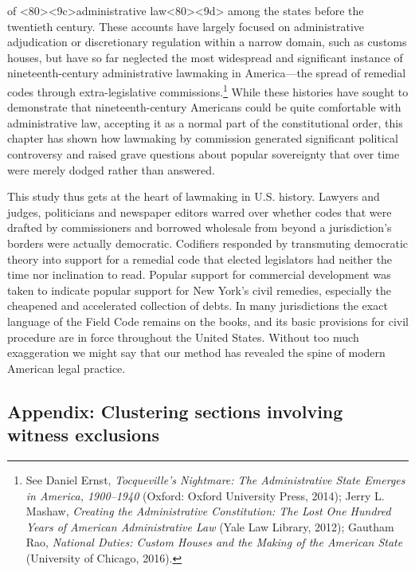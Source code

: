 \documentclass[12pt,]{article}
\let\rmarkdownfootnote\footnote%
\def\footnote{\protect\rmarkdownfootnote}
\begin{document}
of \textless80\textgreater\textless9c\textgreater administrative
law\textless80\textgreater\textless9d\textgreater{} among the states
before the twentieth century. These accounts have largely focused on
administrative adjudication or discretionary regulation within a narrow
domain, such as customs houses, but have so far neglected the most
widespread and significant instance of nineteenth-century administrative
lawmaking in America---the spread of remedial codes through
extra-legislative commissions.\footnote{See Daniel Ernst,
  \emph{Tocqueville's Nightmare: The Administrative State Emerges in
  America, 1900--1940} (Oxford: Oxford University Press, 2014); Jerry L.
  Mashaw, \emph{Creating the Administrative Constitution: The Lost One
  Hundred Years of American Administrative Law} (Yale Law Library,
  2012); Gautham Rao, \emph{National Duties: Custom Houses and the
  Making of the American State} (University of Chicago, 2016).} While
these histories have sought to demonstrate that nineteenth-century
Americans could be quite comfortable with administrative law, accepting
it as a normal part of the constitutional order, this chapter has shown
how lawmaking by commission generated significant political controversy
and raised grave questions about popular sovereignty that over time were
merely dodged rather than answered.

This study thus gets at the heart of lawmaking in U.S. history. Lawyers
and judges, politicians and newspaper editors warred over whether codes
that were drafted by commissioners and borrowed wholesale from beyond a
jurisdiction's borders were actually democratic. Codifiers responded by
transmuting democratic theory into support for a remedial code that
elected legislators had neither the time nor inclination to read.
Popular support for commercial development was taken to indicate popular
support for New York's civil remedies, especially the cheapened and
accelerated collection of debts. In many jurisdictions the exact
language of the Field Code remains on the books, and its basic
provisions for civil procedure are in force throughout the United
States. Without too much exaggeration we might say that our method has
revealed the spine of modern American legal practice.

\hypertarget{appendix-clustering-sections-involving-witness-exclusions}{%
\subsection{Appendix: Clustering sections involving witness
exclusions}\label{appendix-clustering-sections-involving-witness-exclusions}}
\end{document}
